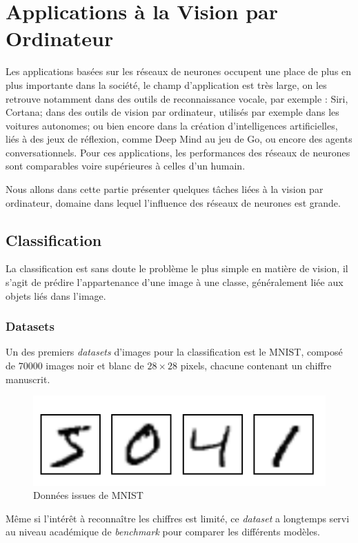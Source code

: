 \documentclass[a4paper, 11pt]{report}
\begin{document}
\section{Applications à la Vision par Ordinateur}
Les applications basées sur les réseaux de neurones occupent une place de plus en plus importante dans la société, le champ d'application est très large, on les retrouve notamment dans des outils de reconnaissance vocale, par exemple : Siri, Cortana; dans des outils de vision par ordinateur, utilisés par exemple dans les voitures autonomes; ou bien encore dans la création d'intelligences artificielles, liés à des jeux de réflexion, comme Deep Mind au jeu de Go, ou encore des agents conversationnels.
Pour ces applications, les performances des réseaux de neurones sont comparables voire supérieures à celles d'un humain.

Nous allons dans cette partie présenter quelques tâches liées à la vision par ordinateur, domaine dans lequel l'influence des réseaux de neurones est grande.
\subsection{Classification}
La classification est sans doute le problème le plus simple en matière de vision, il s'agit de prédire l'appartenance d'une image à une classe, généralement liée aux objets liés dans l'image.
\subsubsection{Datasets}
Un des premiers \emph{datasets} d'images pour la classification est le MNIST, composé de $70000$ images noir et blanc de $28 \times 28$ pixels, chacune contenant un chiffre manuscrit.
\begin{figure}[H]
	\begin{center}
		\includegraphics[scale=0.3]{Images/MNIST_Digits.png}
		\caption{Données issues de MNIST}
	\end{center}
\end{figure}
Même si l'intérêt à reconnaître les chiffres est limité, ce \emph{dataset} a longtemps servi au niveau académique de \emph{benchmark} pour comparer les différents modèles.
\end{document}
